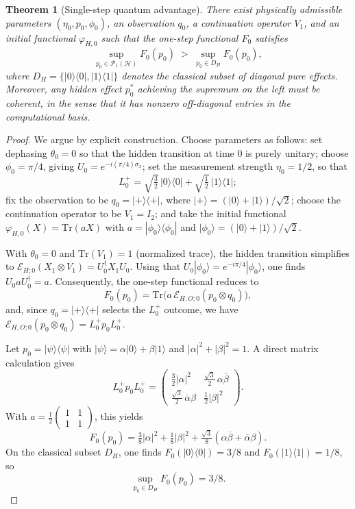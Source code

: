 \documentclass[12pt, reco]{article}
\newtheorem{theorem}{Theorem}[section]
\begin{document}
\begin{theorem}[Single-step quantum advantage]
\label{thm:coherent-optimal-m0}
There exist physically admissible parameters \((\eta_0,p_0,\phi_0)\), an observation \(q_0\), a continuation operator \(V_1\), and an initial functional \(\varphi_{H,0}\) such that the one-step functional \(F_0\) satisfies
\[
\sup_{p_0\in\mathcal{P}_{1}(\mathcal{H})} F_0(p_0)
\;>\;
\sup_{p_0\in D_H} F_0(p_0),
\]
where \(D_H=\{|0\rangle\langle0|,|1\rangle\langle1|\}\) denotes the classical subset of diagonal pure effects. Moreover, any hidden effect \(p_0^*\) achieving the supremum on the left must be coherent, in the sense that it has nonzero off-diagonal entries in the computational basis.
\end{theorem}

\begin{proof}
We argue by explicit construction. Choose parameters as follows: set dephasing \(\theta_0 = 0\) so that the hidden transition at time \(0\) is purely unitary; choose \(\phi_0 = \pi/4\), giving \(U_0 = e^{-i(\pi/4)\sigma_x}\); set the measurement strength \(\eta_0 = 1/2\), so that
\[
L_0^{+} = \sqrt{\tfrac{3}{2}}\,|0\rangle\langle0| + \sqrt{\tfrac{1}{2}}\,|1\rangle\langle1|;
\]
fix the observation to be \(q_0 = |+\rangle\langle+|\), where \(|+\rangle = (|0\rangle+|1\rangle)/\sqrt2\); choose the continuation operator to be \(V_1 =  I_2\); and take the initial functional \(\varphi_{H,0}(X) = \mathrm{Tr}(aX)\) with \(a = |\phi_0\rangle\langle\phi_0|\) and \(|\phi_0\rangle = (|0\rangle+|1\rangle)/\sqrt2\).

With \(\theta_0=0\) and \(\mathrm{Tr}(V_1)=1\) (normalized trace), the hidden transition simplifies to \(\mathcal{E}_{H;0}(X_1\otimes V_1) = U_0^\dagger X_1 U_0\). Using that \(U_0|\phi_0\rangle = e^{-i\pi/4}|\phi_0\rangle\), one finds \(U_0 a U_0^\dagger = a\). Consequently, the one-step functional reduces to
\[
F_0(p_0) = \mathrm{Tr}\bigl(a\,\mathcal{E}_{H,O;0}(p_0\otimes q_0)\bigr),
\]
and, since \(q_0 = |+\rangle\langle+|\) selects the \(L_0^{+}\) outcome, we have \(\mathcal{E}_{H,O;0}(p_0\otimes q_0) = L_0^{+} p_0 L_0^{+}\).

Let \(p_0 = |\psi\rangle\langle\psi|\) with \(|\psi\rangle = \alpha|0\rangle + \beta|1\rangle\) and \(|\alpha|^2+|\beta|^2=1\). A direct matrix calculation gives
\[
L_0^{+} p_0 L_0^{+}
  =
  \begin{pmatrix}
    \tfrac{3}{2}|\alpha|^2 & \tfrac{\sqrt{3}}{2}\,\alpha\overline{\beta} \\
    \tfrac{\sqrt{3}}{2}\,\overline{\alpha}\beta & \tfrac{1}{2}|\beta|^2
  \end{pmatrix}.
\]
With \(a = \tfrac12\begin{pmatrix}1&1\\[2pt]1&1\end{pmatrix}\), this yields
\[
F_0(p_0)
  = \tfrac{3}{8}|\alpha|^2 + \tfrac{1}{8}|\beta|^2
    + \tfrac{\sqrt{3}}{8}(\alpha\overline{\beta} + \overline{\alpha}\beta).
\]
On the classical subset \(D_H\), one finds \(F_0(|0\rangle\langle0|) = 3/8\) and \(F_0(|1\rangle\langle1|) = 1/8\), so
\[
\sup_{p_0\in D_H} F_0(p_0) = 3/8.
\]


\end{proof}
\end{document}
